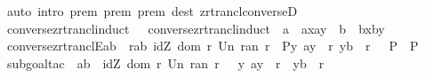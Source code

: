 \begin{isabellebody}
\isamarkupfalse%
\ {\isacharparenleft}auto\ intro{\isacharcolon}\ prem{}\ prem{}\ prem{}\ dest{\isacharbang}{\isacharcolon}\ zrtrancl{\isacharunderscore}converseD{\isacharparenright}\isanewline
{}\isamarkupfalse%
%
\endisatagproof
{\isafoldproof}%
%
\isadelimproof
\isanewline
%
\endisadelimproof
\isanewline
{}\isamarkupfalse%
\ converse{\isacharunderscore}zrtrancl{\isacharunderscore}induct{}\ {\isacharequal}\ \ converse{\isacharunderscore}zrtrancl{\isacharunderscore}induct\ {\isacharbrackleft}\ a\ {\isacharequal}\ {\isachardoublequoteopen}{\isacharparenleft}ax{\isacharcomma}ay{\isacharparenright}{\isachardoublequoteclose}\ \ b\ {\isacharequal}\ {\isachardoublequoteopen}{\isacharparenleft}bx{\isacharcomma}by{\isacharparenright}{\isachardoublequoteclose}{\isacharbrackright}\isanewline
\isanewline
{}\isamarkupfalse%
\ converse{\isacharunderscore}zrtranclE{}{\isacharcolon}{\isachardoublequoteopen}{\isasymlbrakk}{\isacharparenleft}a{\isacharcomma}b{\isacharparenright}\ {\isacharcolon}\ r{\isacharpercent}{\isacharasterisk}{\isacharsemicolon}{\isacharparenleft}a{\isacharcomma}b{\isacharparenright}{\isacharcolon}\ {\isacharparenleft}idZ\ {\isacharparenleft}dom\ r\ Un\ ran\ r{\isacharparenright}{\isacharparenright}\ \ {\isacharequal}{\isacharequal}{\isachargreater}P{\isacharsemicolon}{\isacharbang}{\isacharbang}y{\isachardot}{\isacharbrackleft}{\isacharbar}\ {\isacharparenleft}a{\isacharcomma}y{\isacharparenright}\ {\isacharcolon}\ r{\isacharsemicolon}\ {\isacharparenleft}y{\isacharcomma}b{\isacharparenright}\ {\isacharcolon}\ r{\isacharpercent}{\isacharasterisk}\ {\isacharbar}{\isacharbrackright}\ {\isacharequal}{\isacharequal}{\isachargreater}\ P{\isasymrbrakk}\ {\isasymLongrightarrow}\ P{\isachardoublequoteclose}\isanewline
%
\isadelimproof
%
\endisadelimproof
%
\isatagproof
{}\isamarkupfalse%
\ {\isacharparenleft}subgoal{\isacharunderscore}tac\ {\isachardoublequoteopen}\ {\isacharparenleft}a{\isacharcomma}b{\isacharparenright}\ {\isacharcolon}\ idZ\ {\isacharparenleft}dom\ r\ Un\ ran\ r{\isacharparenright}\ {\isacharbar}\ {\isacharparenleft}{\isacharquery}\ y{\isachardot}\ {\isacharparenleft}a{\isacharcomma}y{\isacharparenright}\ {\isacharcolon}\ r\ {\isacharampersand}\ {\isacharparenleft}y{\isacharcomma}b{\isacharparenright}\ {\isacharcolon}\ r{\isacharpercent}{\isacharasterisk}{\isacharparenright}{\isachardoublequoteclose}{\isacharparenright}\isanewline
{}\isamarkupfalse%

\end{isabellebody}
